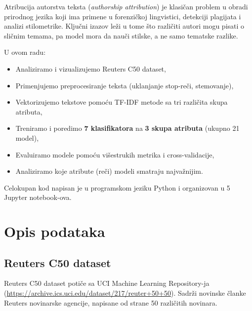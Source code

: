 \documentclass[12pt, a4paper]{article}
\begin{document}
Atribucija autorstva teksta (\textit{authorship attribution}) je klasičan problem u obradi
prirodnog jezika koji ima primene u forenzičkoj lingvistici, detekciji plagijata i analizi
stilometrike. Ključni izazov leži u tome što različiti autori mogu pisati o sličnim temama,
pa model mora da nauči stilske, a ne samo tematske razlike.

U ovom radu:
\begin{itemize}
    \item Analiziramo i vizualizujemo Reuters C50 dataset,
    \item Primenjujemo preprocesiranje teksta (uklanjanje stop-reči, stemovanje),
    \item Vektorizujemo tekstove pomoću TF-IDF metode sa tri različita skupa atributa,
    \item Treniramo i poredimo \textbf{7 klasifikatora} na \textbf{3 skupa atributa} (ukupno 21 model),
    \item Evaluiramo modele pomoću višestrukih metrika i cross-validacije,
    \item Analiziramo koje atribute (reči) modeli smatraju najvažnijim.
\end{itemize}

Celokupan kod napisan je u programskom jeziku Python i organizovan u 5 Jupyter notebook-ova.

\section{Opis podataka}

\subsection{Reuters C50 dataset}

Reuters C50 dataset potiče sa UCI Machine Learning Repository-ja
(\url{https://archive.ics.uci.edu/dataset/217/reuter+50+50}).
Sadrži novinske članke Reuters novinarske agencije, napisane od strane 50 različitih novinara.
\end{document}
